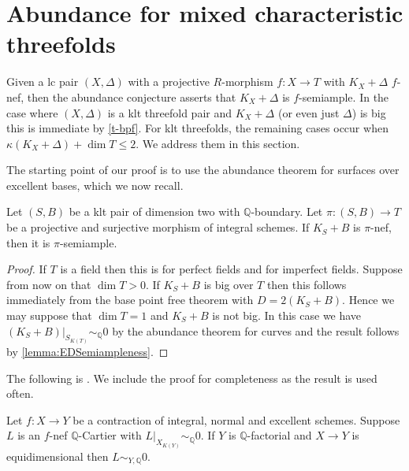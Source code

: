 \documentclass[a4paper,12pt]{book}
\begin{document}
	\section{Abundance for mixed characteristic threefolds}
	
	Given a lc pair $(X,\Delta)$ with a projective $R$-morphism $f \colon X \to T$ with $K_{X}+\Delta$ $f$-nef, then the abundance conjecture asserts that $K_{X}+\Delta$ is $f$-semiample. 
	In the case where $(X,\Delta)$ is a klt threefold pair and $K_{X}+\Delta$ (or even just $\Delta$) is big this is immediate by \autoref{t-bpf}. For klt threefolds, the remaining cases occur when $\kappa(K_{X}+\Delta) + \dim T \leq 2$. We address them in this section.
	
	The starting point of our proof is to use the abundance theorem for surfaces over excellent bases, which we now recall. 
	
	\begin{theorem}\label{abundance-dim2}
		Let $(S,B)$ be a klt pair of dimension two with $\mathbb{Q}$-boundary. 
		Let $\pi \colon (S,B) \to T$ be a projective and surjective morphism of integral schemes. If $K_{S}+B$ is $\pi$-nef, then it is $\pi$-semiample.
	\end{theorem}
	
	\begin{proof}	
		If $T$ is a field then this is \cite[Theorem 1.2]{fujino2012log} for perfect fields and \cite{tanaka2020abundance} for imperfect fields. 
		Suppose from now on that $\dim T > 0$.
		If $K_{S}+B$ is big over $T$ then this follows immediately from the base point free theorem \cite[Theorem 4.2]{Tan18} with $D=2(K_{S}+B)$. Hence we may suppose that $\dim T=1$ and $K_{S}+B$ is not big. In this case we have $(K_{S}+B)|_{S_{K(T)}} \sim_{\mathbb{Q}} 0$ by the abundance theorem for curves and the result follows by \autoref{lemma:EDSemiampleness}. 
	\end{proof}
	
	The following is \cite[Lemma 2.17]{cascini2020relative}. We include the proof for completeness as the result is used often.
	
	
	\begin{lemma}\label{lemma:EDSemiampleness}
		Let $f\colon X \to Y$ be a contraction of integral, normal and excellent schemes. Suppose $L$ is an $f$-nef $\mathbb{Q}$-Cartier with $L|_{X_{K(Y)}} \sim_{\mathbb{Q}} 0$. If $Y$ is $\mathbb{Q}$-factorial and $X \to Y$ is equidimensional then $L \sim_{Y,\mathbb{Q}} 0$.
	\end{lemma}
	
\end{document}
